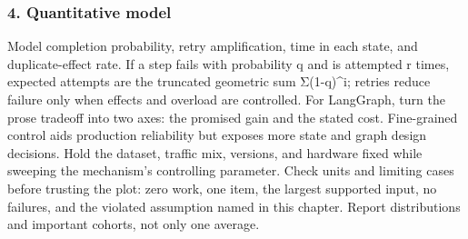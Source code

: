 \subsubsection*{4. Quantitative model}
Model completion probability, retry amplification, time in each state, and duplicate-effect rate. If a step fails with probability q and is attempted r times, expected attempts are the truncated geometric sum Σ(1-q)\textasciicircum{}i; retries reduce failure only when effects and overload are controlled.
For LangGraph, turn the prose tradeoff into two axes: the promised gain and the stated cost. Fine-grained control aids production reliability but exposes more state and graph design decisions. Hold the dataset, traffic mix, versions, and hardware fixed while sweeping the mechanism's controlling parameter.
Check units and limiting cases before trusting the plot: zero work, one item, the largest supported input, no failures, and the violated assumption named in this chapter. Report distributions and important cohorts, not only one average.
